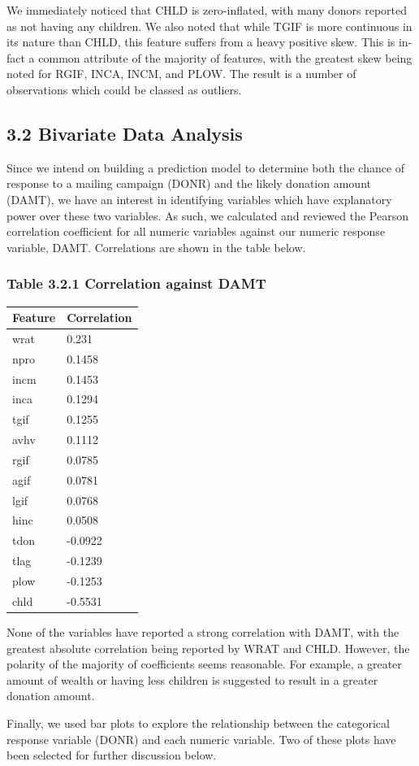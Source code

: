 \documentclass[]{article}
\begin{document}
We immediately noticed that CHLD is zero-inflated, with many donors
reported as not having any children. We also noted that while TGIF is
more continuous in its nature than CHLD, this feature suffers from a
heavy positive skew. This is in-fact a common attribute of the majority
of features, with the greatest skew being noted for RGIF, INCA, INCM,
and PLOW. The result is a number of observations which could be classed
as outliers.

\subsection{3.2 Bivariate Data Analysis}\label{bivariate-data-analysis}

Since we intend on building a prediction model to determine both the
chance of response to a mailing campaign (DONR) and the likely donation
amount (DAMT), we have an interest in identifying variables which have
explanatory power over these two variables. As such, we calculated and
reviewed the Pearson correlation coefficient for all numeric variables
against our numeric response variable, DAMT. Correlations are shown in
the table below.

\subsubsection{Table 3.2.1 Correlation against
DAMT}\label{table-3.2.1-correlation-against-damt}

\begin{longtable}[]{@{}ll@{}}
\toprule
Feature & Correlation\tabularnewline
\midrule
\endhead
wrat & 0.231\tabularnewline
npro & 0.1458\tabularnewline
incm & 0.1453\tabularnewline
inca & 0.1294\tabularnewline
tgif & 0.1255\tabularnewline
avhv & 0.1112\tabularnewline
rgif & 0.0785\tabularnewline
agif & 0.0781\tabularnewline
lgif & 0.0768\tabularnewline
hinc & 0.0508\tabularnewline
tdon & -0.0922\tabularnewline
tlag & -0.1239\tabularnewline
plow & -0.1253\tabularnewline
chld & -0.5531\tabularnewline
\bottomrule
\end{longtable}

None of the variables have reported a strong correlation with DAMT, with
the greatest absolute correlation being reported by WRAT and CHLD.
However, the polarity of the majority of coefficients seems reasonable.
For example, a greater amount of wealth or having less children is
suggested to result in a greater donation amount.

Finally, we used bar plots to explore the relationship between the
categorical response variable (DONR) and each numeric variable. Two of
these plots have been selected for further discussion below.
\end{document}
